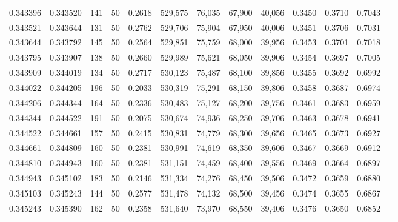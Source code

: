 \begin{tabular}{rrrrrrrrrrrrr}
0.343396 & 0.343520 &   141 &  50 &                                     0.2618 & 529,575 &  76,035 &  67,900 &  40,056 & 0.3450 & 0.3710 & 0.7043 \\
0.343521 & 0.343644 &   131 &  50 &                                     0.2762 & 529,706 &  75,904 &  67,950 &  40,006 & 0.3451 & 0.3706 & 0.7031 \\
0.343644 & 0.343792 &   145 &  50 &                                     0.2564 & 529,851 &  75,759 &  68,000 &  39,956 & 0.3453 & 0.3701 & 0.7018 \\
0.343795 & 0.343907 &   138 &  50 &                                     0.2660 & 529,989 &  75,621 &  68,050 &  39,906 & 0.3454 & 0.3697 & 0.7005 \\
0.343909 & 0.344019 &   134 &  50 &                                     0.2717 & 530,123 &  75,487 &  68,100 &  39,856 & 0.3455 & 0.3692 & 0.6992 \\
0.344022 & 0.344205 &   196 &  50 &                                     0.2033 & 530,319 &  75,291 &  68,150 &  39,806 & 0.3458 & 0.3687 & 0.6974 \\
0.344206 & 0.344344 &   164 &  50 &                                     0.2336 & 530,483 &  75,127 &  68,200 &  39,756 & 0.3461 & 0.3683 & 0.6959 \\
0.344344 & 0.344522 &   191 &  50 &                                     0.2075 & 530,674 &  74,936 &  68,250 &  39,706 & 0.3463 & 0.3678 & 0.6941 \\
0.344522 & 0.344661 &   157 &  50 &                                     0.2415 & 530,831 &  74,779 &  68,300 &  39,656 & 0.3465 & 0.3673 & 0.6927 \\
0.344661 & 0.344809 &   160 &  50 &                                     0.2381 & 530,991 &  74,619 &  68,350 &  39,606 & 0.3467 & 0.3669 & 0.6912 \\
0.344810 & 0.344943 &   160 &  50 &                                     0.2381 & 531,151 &  74,459 &  68,400 &  39,556 & 0.3469 & 0.3664 & 0.6897 \\
0.344943 & 0.345102 &   183 &  50 &                                     0.2146 & 531,334 &  74,276 &  68,450 &  39,506 & 0.3472 & 0.3659 & 0.6880 \\
0.345103 & 0.345243 &   144 &  50 &                                     0.2577 & 531,478 &  74,132 &  68,500 &  39,456 & 0.3474 & 0.3655 & 0.6867 \\
0.345243 & 0.345390 &   162 &  50 &                                     0.2358 & 531,640 &  73,970 &  68,550 &  39,406 & 0.3476 & 0.3650 & 0.6852 \\

\end{tabular}

